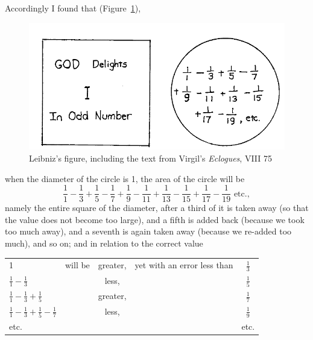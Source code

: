 \documentclass[twoside,openright]{article}
\begin{document}
Accordingly I found that (Figure~\ref{God'sdelight}),
\begin{figure}[htp]
  \begin{center}
    \includegraphics[width=.9\textwidth]{fig/Figure60}
        \caption{Leibniz's figure, including the text from Virgil's {\em Eclogues}, VIII 75}
    \label{God'sdelight}
  \end{center}
\end{figure}
when the diameter of the circle is 1, the area of the circle will be
$$\frac{1}{1} - \frac{1}{3} + \frac{1}{5} -
\frac{1}{7} + \frac{1}{9} - \frac{1}{11} + \frac{1}{13} - \frac{1}{15}
+ \frac{1}{17} - \frac{1}{19} \mbox{ etc.},$$ \hspace{-.75em} namely the entire square of the
diameter, after a third of it is taken away (so that the value does
not become too large), and a fifth is added back (because we took too
much away), and a seventh is again taken away (because we re-added too
much), and so on; and in relation to the correct value

\vspace*{1ex}

\begin{tabular}{lcccc}
  \rule[-1.5ex]{0ex}{3ex} 1 & will be & greater, & yet with an error less than & $\frac{1}{3}$\\
  \rule[-1.5ex]{0ex}{3ex} $\frac{1}{1} - \frac{1}{3}$ & \dotfill
                                      & less, &\dotfill & $\frac{1}{5}$ \\
  \rule[-1.5ex]{0ex}{3ex} $\frac{1}{1} - \frac{1}{3} + \frac{1}{5}$ & \dotfill
                                      & greater, &\dotfill & $\frac{1}{7}$ \\
  \rule[-1.5ex]{0ex}{3ex} $\frac{1}{1} - \frac{1}{3} +\frac{1}{5} - \frac{1}{7}$
                            & \dotfill & less, &\dotfill & $\frac{1}{9}$ \\
  \rule[-1.5ex]{0ex}{3ex} etc. &  & & & etc.\\
\end{tabular}
\end{document}

